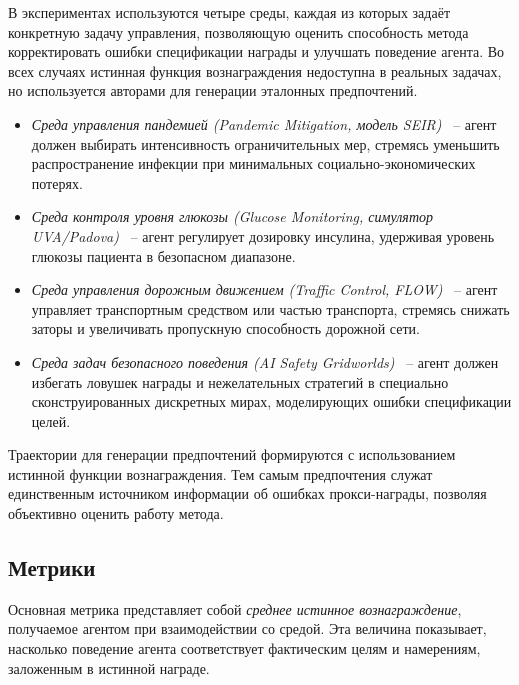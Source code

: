 В экспериментах используются четыре среды, каждая из которых задаёт 
конкретную задачу управления, позволяющую оценить способность метода 
корректировать ошибки спецификации награды и улучшать поведение агента. 
Во всех случаях истинная функция вознаграждения недоступна в реальных задачах, 
но используется авторами для генерации эталонных предпочтений.

\begin{itemize}
    \item \emph{Среда управления пандемией (Pandemic Mitigation, модель SEIR)} 
    \cite{kompella2020covid}~-- агент должен выбирать интенсивность 
    ограничительных мер, стремясь уменьшить распространение инфекции 
    при минимальных социально-экономических потерях.

    \item \emph{Среда контроля уровня глюкозы (Glucose Monitoring, симулятор UVA/Padova)} 
    \cite{man2014uvapadova}~-- агент регулирует дозировку инсулина, удерживая 
    уровень глюкозы пациента в безопасном диапазоне.

    \item \emph{Среда управления дорожным движением (Traffic Control, FLOW)}
    \cite{wu2021flow}~-- агент управляет транспортным средством или частью 
    транспорта, стремясь снижать заторы и увеличивать пропускную способность 
    дорожной сети.

    \item \emph{Среда задач безопасного поведения (AI Safety Gridworlds)} 
    \cite{leike2017aisg}~-- агент должен избегать ловушек награды и 
    нежелательных стратегий в специально сконструированных дискретных мирах, 
    моделирующих ошибки спецификации целей.
\end{itemize}

Траектории для генерации предпочтений формируются с использованием истинной 
функции вознаграждения. Тем самым предпочтения служат единственным источником 
информации об ошибках прокси-награды, позволяя объективно оценить работу метода.

\subsection{Метрики}

Основная метрика представляет собой \emph{среднее истинное вознаграждение}, 
получаемое агентом при взаимодействии со средой. Эта величина показывает, 
насколько поведение агента соответствует фактическим целям и намерениям, 
заложенным в истинной награде.

